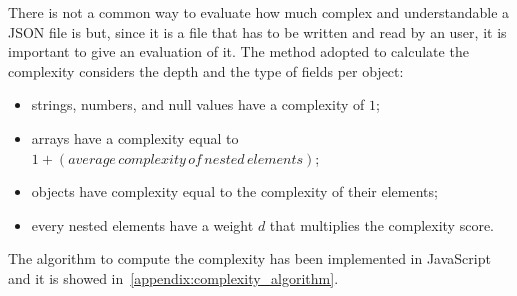 \documentclass[../thesis.tex]{subfiles}
\begin{document}
There is not a common way to evaluate how much complex and understandable a JSON file is but, since it is a file that has to be written and read by an user, it is important to give an evaluation of it. The method adopted to calculate the complexity considers the depth and the type of fields per object: 
\begin{itemize}
    \item strings, numbers, and null values have a complexity of $1$;
    \item arrays have a complexity equal to $1 + (average\, complexity\, of\, nested\, elements)$;
    \item objects have complexity equal to the complexity of their elements;
    \item every nested elements have a weight $d$ that multiplies the complexity score. 
\end{itemize}
The algorithm to compute the complexity has been implemented in JavaScript and it is showed in~\ref{appendix:complexity_algorithm}. 
\end{document}
